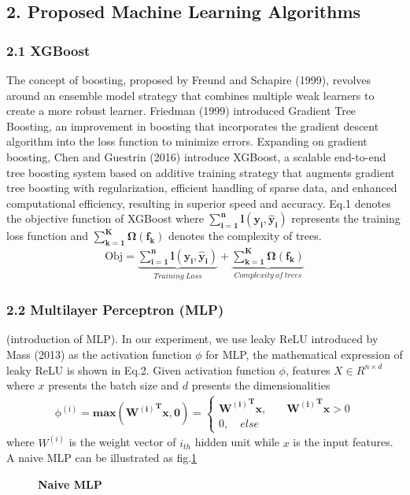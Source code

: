\documentclass[10pt,letterpaper]{article}
\begin{document}
\subsection*{2. Proposed Machine Learning Algorithms}

\subsubsection*{2.1 XGBoost}
 The concept of boosting, proposed by Freund and Schapire (1999), revolves around an ensemble model strategy that combines multiple weak learners to create a more robust learner. Friedman (1999) introduced Gradient Tree Boosting, an improvement in boosting that incorporates the gradient descent algorithm into the loss function to minimize errors. Expanding on gradient boosting, Chen and Guestrin (2016) introduce XGBoost, a scalable end-to-end tree boosting system based on additive training strategy that augments gradient tree boosting with regularization, efficient handling of sparse data, and enhanced computational efficiency, resulting in superior speed and accuracy. Eq.1 denotes the objective function of XGBoost where \(\mathbf{\sum_{i=1}^{n}l(y_i,\hat{y}_i)}\) represents the training loss function and \(\mathbf{{\sum_{k=1}^{K}}\Omega(f_k)}\) denotes the complexity of trees.
\begin{eqnarray}
\label{eq:schemeP}
\mathrm{Obj}=\underbrace{\mathbf{\sum_{i=1}^{n}l(y_i,\hat{y}_i)}}_{Training \: Loss} +\underbrace{\mathbf{{\sum_{k=1}^{K}}\Omega(f_k)}}_{Complexity \: of \: trees}
\end{eqnarray}


\subsubsection*{2.2 Multilayer Perceptron (MLP)}

(introduction of MLP).
In our experiment, we use leaky ReLU introduced by Mass (2013) as the activation function \(\phi\) for MLP, the mathematical expression of leaky ReLU  is shown in Eq.2. Given activation function \(\phi\), features \(X \in R^ {n\times d}\) where \(x\) presents the batch size and \(d\) presents the dimensionalities
\begin{eqnarray}
\label{eq:schemeP}
\mathrm{\phi^{(i)}} =\mathbf{max({W^{(i)}}^{T}x,0)}=
\begin{cases}
\mathbf{{W^{(i)}}^{T}x},\quad &\mathbf{{W^{(i)}}^{T}x}>0\\0, \quad else
\end{cases}
\end{eqnarray}
where \(W^{(i)}\) is the weight vector of \(i_{th}\) hidden unit while \(x\) is the input features. A naive MLP can be illustrated as fig.\ref{MLP}
\begin{figure}[!h]
\caption{{\bf Naive MLP}}
\label{MLP}
\end{figure}
\end{document}
